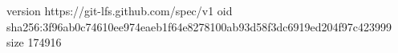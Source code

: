 version https://git-lfs.github.com/spec/v1
oid sha256:3f96ab0c74610ee974eaeb1f64e8278100ab93d58f3dc6919ed204f97c423999
size 174916
